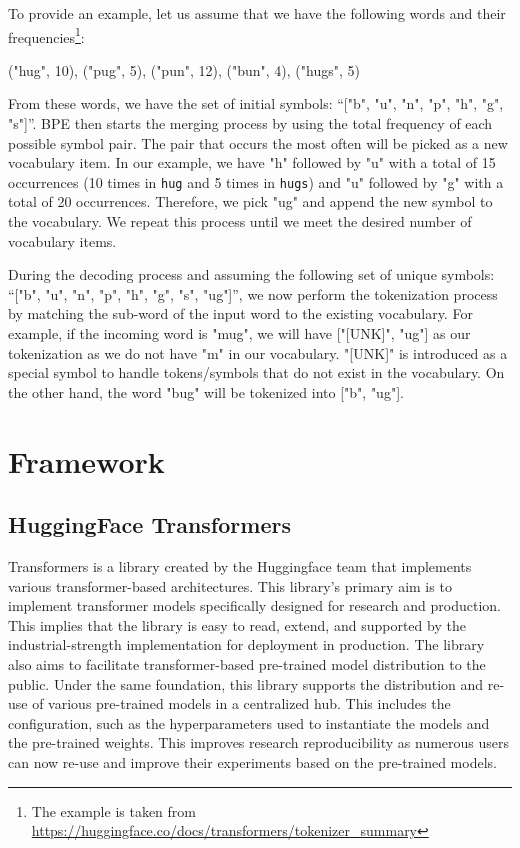To provide an example, let us assume that we have the following words and their frequencies\footnote{The example is taken from \url{https://huggingface.co/docs/transformers/tokenizer_summary}}:

\bigskip
("hug", 10), ("pug", 5), ("pun", 12), ("bun", 4), ("hugs", 5)
\bigskip

From these words, we have the set of initial symbols: ``["b", "u", "n", "p", "h", "g", "s"]''. BPE then starts the merging process by using the total frequency of each possible symbol pair. The pair that occurs the most often will be picked as a new vocabulary item. In our example, we have "h" followed by "u" with a total of 15 occurrences (10 times in \texttt{hug} and 5 times in \texttt{hugs}) and "u" followed by "g" with a total of 20 occurrences. Therefore, we pick "ug" and append the new symbol to the vocabulary. We repeat this process until we meet the desired number of vocabulary items.

During the decoding process and assuming the following set of unique symbols: ``["b", "u", "n", "p", "h", "g", "s", "ug"]'', we now perform the tokenization process by matching the sub-word of the input word to the existing vocabulary. For example, if the incoming word is "mug", we will have ["[UNK]", "ug"] as our tokenization as we do not have "m" in our vocabulary. "[UNK]" is introduced as a special symbol to handle tokens/symbols that do not exist in the vocabulary. On the other hand, the word "bug" will be tokenized into ["b", "ug"].

\section{Framework}
\label{sec:framework}
\subsection{HuggingFace Transformers}
Transformers  is a library created by the Huggingface team that implements various transformer-based architectures. This library's primary aim is to implement transformer models specifically designed for research and production. This implies that the library is easy to read, extend, and supported by the industrial-strength implementation for deployment in production. The library also aims to facilitate transformer-based pre-trained model distribution to the public. Under the same foundation, this library supports the distribution and re-use of various pre-trained models in a centralized hub. This includes the configuration, such as the hyperparameters used to instantiate the models and the pre-trained weights. This improves research reproducibility as numerous users can now re-use and improve their experiments based on the pre-trained models.

